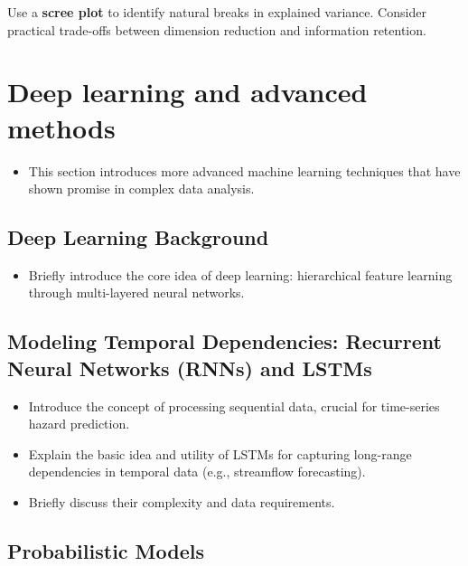 \documentclass[
  letterpaper,
  DIV=11,
  numbers=noendperiod]{scrreprt}
\providecommand{\tightlist}{%
  \setlength{\itemsep}{0pt}\setlength{\parskip}{0pt}}
\begin{document}
Use a \textbf{scree plot} to identify natural breaks in explained
variance. Consider practical trade-offs between dimension reduction and
information retention.

\section{Deep learning and advanced
methods}\label{deep-learning-and-advanced-methods}

\begin{itemize}
\tightlist
\item
  This section introduces more advanced machine learning techniques that
  have shown promise in complex data analysis.
\end{itemize}

\subsection{Deep Learning Background}\label{deep-learning-background}

\begin{itemize}
\tightlist
\item
  Briefly introduce the core idea of deep learning: hierarchical feature
  learning through multi-layered neural networks.
\end{itemize}

\subsection{Modeling Temporal Dependencies: Recurrent Neural Networks
(RNNs) and
LSTMs}\label{modeling-temporal-dependencies-recurrent-neural-networks-rnns-and-lstms}

\begin{itemize}
\tightlist
\item
  Introduce the concept of processing sequential data, crucial for
  time-series hazard prediction.
\item
  Explain the basic idea and utility of LSTMs for capturing long-range
  dependencies in temporal data (e.g., streamflow forecasting).
\item
  Briefly discuss their complexity and data requirements.
\end{itemize}

\subsection{Probabilistic Models}\label{probabilistic-models}
\end{document}
